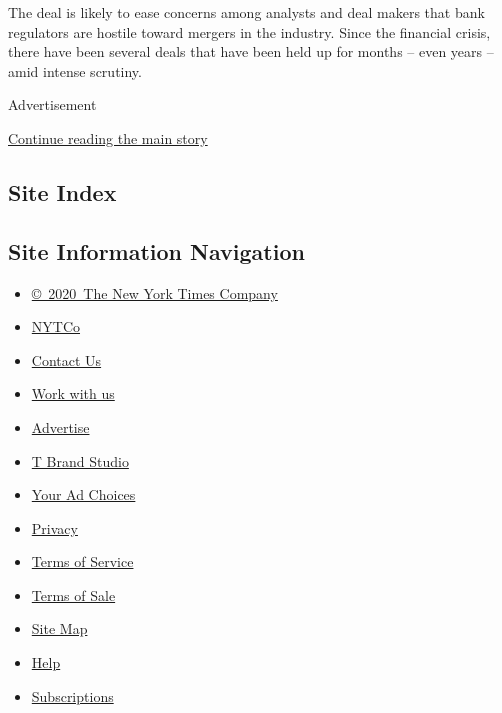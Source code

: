 The deal is likely to ease concerns among analysts and deal makers that
bank regulators are hostile toward mergers in the industry. Since the
financial crisis, there have been several deals that have been held up
for months -- even years -- amid intense scrutiny.

Advertisement

\protect\hyperlink{after-bottom}{Continue reading the main story}

\hypertarget{site-index}{%
\subsection{Site Index}\label{site-index}}

\hypertarget{site-information-navigation}{%
\subsection{Site Information
Navigation}\label{site-information-navigation}}

\begin{itemize}
\tightlist
\item
  \href{https://help.nytimes.com/hc/en-us/articles/115014792127-Copyright-notice}{©~2020~The
  New York Times Company}
\end{itemize}

\begin{itemize}
\tightlist
\item
  \href{https://www.nytco.com/}{NYTCo}
\item
  \href{https://help.nytimes.com/hc/en-us/articles/115015385887-Contact-Us}{Contact
  Us}
\item
  \href{https://www.nytco.com/careers/}{Work with us}
\item
  \href{https://nytmediakit.com/}{Advertise}
\item
  \href{http://www.tbrandstudio.com/}{T Brand Studio}
\item
  \href{https://www.nytimes.com/privacy/cookie-policy\#how-do-i-manage-trackers}{Your
  Ad Choices}
\item
  \href{https://www.nytimes.com/privacy}{Privacy}
\item
  \href{https://help.nytimes.com/hc/en-us/articles/115014893428-Terms-of-service}{Terms
  of Service}
\item
  \href{https://help.nytimes.com/hc/en-us/articles/115014893968-Terms-of-sale}{Terms
  of Sale}
\item
  \href{https://spiderbites.nytimes.com}{Site Map}
\item
  \href{https://help.nytimes.com/hc/en-us}{Help}
\item
  \href{https://www.nytimes.com/subscription?campaignId=37WXW}{Subscriptions}
\end{itemize}
